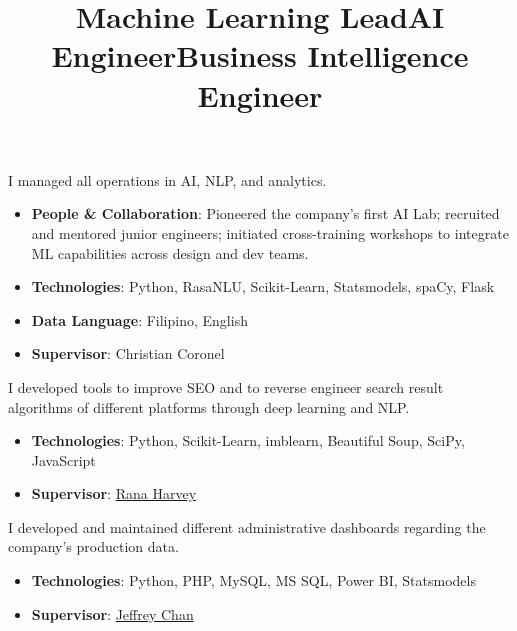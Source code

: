 \documentclass[margin]{res}
\begin{document}
\begin{resume}
\title{\textbf{Machine Learning Lead}}
\begin{position}
I managed all operations in AI, NLP, and analytics.\\
\vspace{-3mm}
\begin{itemize}
    \item \textbf{People \& Collaboration}: Pioneered the company’s first AI Lab; recruited and mentored junior engineers; initiated cross-training workshops to integrate ML capabilities across design and dev teams.
    \item \textbf{Technologies}: Python, RasaNLU, Scikit-Learn, Statsmodels, spaCy, Flask
    \item \textbf{Data Language}: Filipino, English
    \item \textbf{Supervisor}: Christian Coronel
\end{itemize}
\end{position}

\title{\textbf{AI Engineer}}
\begin{position}
I developed tools to improve SEO and to reverse engineer search result algorithms of 
different platforms through deep learning and NLP.\\
\vspace{-3mm}
\begin{itemize}
    \item \textbf{Technologies}: Python, Scikit-Learn, imblearn, Beautiful Soup, SciPy, JavaScript
    \item \textbf{Supervisor}: \href{https://www.linkedin.com/in/rana-harvey-8256282a}{Rana Harvey}
\end{itemize}
\end{position}

\title{\textbf{Business Intelligence Engineer}}
\begin{position}
I developed and maintained different administrative dashboards regarding the company's production data.\\
\vspace{-3mm}
\begin{itemize}
    \item \textbf{Technologies}: Python, PHP, MySQL, MS SQL, Power BI, Statsmodels
    \item \textbf{Supervisor}: \href{https://www.linkedin.com/in/jeffrey-chan-088818}{Jeffrey Chan}
\end{itemize}
\end{position}


\end{resume}
\end{document}
